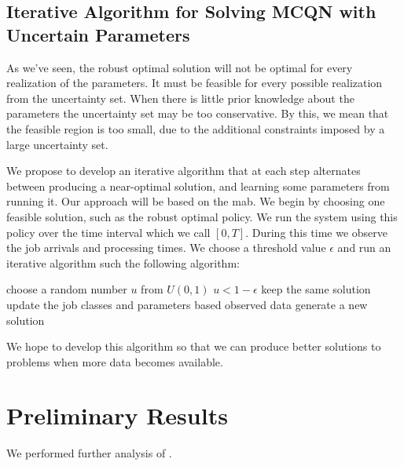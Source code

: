 \documentclass[11pt,a4paper,titlepage]{article}
\theoremstyle{definition}
\theoremstyle{plain}
\begin{document}
\subsection{Iterative Algorithm for Solving MCQN with Uncertain Parameters}
\label{subsec:topics:iterative}

As we've seen,
the robust optimal solution will not be optimal for every realization of the parameters.
It must be feasible for every possible realization from the uncertainty set.
When there is little prior knowledge about the parameters
the uncertainty set may be too conservative.
By this,
we mean that the feasible region is too small,
due to the additional constraints imposed by a large uncertainty set.

We propose to develop an iterative algorithm that at each step
alternates between producing a near-optimal solution,
and learning some parameters from running it.
Our approach will be based on the \gls{mab}.
We begin by choosing one feasible solution,
such as the robust optimal policy.
We run the system using this policy over the time interval which we call $[0,T]$.
During this time we observe the job arrivals and processing times.
We choose a threshold value $\epsilon$
and run an iterative algorithm such the following algorithm:

\begin{algorithmic}[0]
    \Loop
        \State choose a random number $u$ from $U(0,1)$
        \If $u < 1 - \epsilon$
            \State keep the same solution
        \Else
            \State update the job classes and parameters based observed data
            \State generate a new solution
        \EndIf
    \EndLoop
\end{algorithmic}

We hope to develop this algorithm so that we can produce better solutions to problems when more data becomes available.


\section{Preliminary Results}
\label{sec:results}

We performed further analysis of .

\newcommand{\modelone}{Model 1}
\newcommand{\modeltwo}{Model 2}
\end{document}
